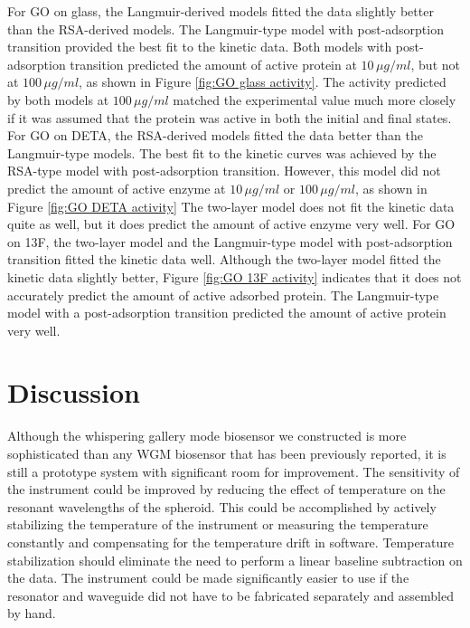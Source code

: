 For GO on glass, the Langmuir-derived models fitted the data slightly
better than the RSA-derived models. The Langmuir-type model with post-adsorption
transition provided the best fit to the kinetic data. Both models
with post-adsorption transition predicted the amount of active protein
at $10\,\mu g/ml$, but not at $100\,\mu g/ml$, as shown in Figure
\ref{fig:GO glass activity}. The activity predicted by both models
at $100\,\mu g/ml$ matched the experimental value much more closely
if it was assumed that the protein was active in both the initial
and final states. For GO on DETA, the RSA-derived models fitted the
data better than the Langmuir-type models. The best fit to the kinetic
curves was achieved by the RSA-type model with post-adsorption transition.
However, this model did not predict the amount of active enzyme at
$10\,\mu g/ml$ or $100\,\mu g/ml$, as shown in Figure \ref{fig:GO DETA activity}
The two-layer model does not fit the kinetic data quite as well, but
it does predict the amount of active enzyme very well. For GO on 13F,
the two-layer model and the Langmuir-type model with post-adsorption
transition fitted the kinetic data well. Although the two-layer model
fitted the kinetic data slightly better, Figure \ref{fig:GO 13F activity}
indicates that it does not accurately predict the amount of active
adsorbed protein. The Langmuir-type model with a post-adsorption transition
predicted the amount of active protein very well.


\section{Discussion}

Although the whispering gallery mode biosensor we constructed is more
sophisticated than any WGM biosensor that has been previously reported,
it is still a prototype system with significant room for improvement.
The sensitivity of the instrument could be improved by reducing the
effect of temperature on the resonant wavelengths of the spheroid.
This could be accomplished by actively stabilizing the temperature
of the instrument or measuring the temperature constantly and compensating
for the temperature drift in software. Temperature stabilization should
eliminate the need to perform a linear baseline subtraction on the
data. The instrument could be made significantly easier to use if
the resonator and waveguide did not have to be fabricated separately
and assembled by hand.

